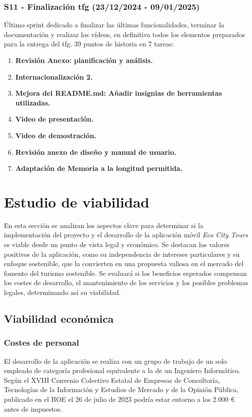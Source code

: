\subsubsection{S11 - Finalización \acrshort{tfg} (23/12/2024 - 09/01/2025)}
Último sprint dedicado a finalizar las últimas funcionalidades, terminar la documentación y realizar los vídeos, en definitiva todos los elementos preparados para la entrega del \acrfull{tfg}. 39 puntos de historia en 7 tareas:
\begin{enumerate}
	\item \textbf{Revisión Anexo: planificación y análisis.}
	\item \textbf{Internacionalización 2.}
	\item \textbf{Mejora del README.md: Añadir insignias de herramientas utilizadas.}
	\item \textbf{Video de presentación.}
	\item \textbf{Video de demostración.}
	\item \textbf{Revisión anexo de diseño y manual de usuario.}
	\item \textbf{Adaptación de Memoria a la longitud permitida.}
\end{enumerate}

\section{Estudio de viabilidad}
En esta sección se analizan los aspectos clave para determinar si la implementación del proyecto y el desarrollo de la aplicación móvil \textit{Eco City Tours} es viable desde un punto de vista legal y económico. Se destacan los valores positivos de la aplicación, como su independencia de intereses particulares y su enfoque sostenible, que la convierten en una propuesta valiosa en el mercado del fomento del turismo sostenible. Se evaluará si los beneficios esperados compensan los costes de desarrollo, el mantenimiento de los servicios y los posibles problemas legales, determinando así su viabilidad.
\subsection{Viabilidad económica}
\subsubsection{Costes de personal}
El desarrollo de la aplicación se realiza con un grupo de trabajo de un solo empleado de categoría profesional equivalente a la de un Ingeniero Informático. Según el XVIII Convenio Colectivo Estatal de Empresas de Consultoría, Tecnologías de la Información y Estudios de Mercado y de la Opinión Pública, publicado en el BOE el 26 de julio de 2023 \cite{boe2023_consultoria} podría estar entorno a los 2.000 € antes de impuestos.

